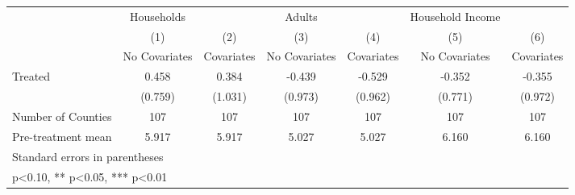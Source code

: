 {
\def\sym#1{\ifmmode^{#1}\else\(^{#1}\)\fi}
\begin{tabular}{l*{6}{c}}
\hline\hline
            &  Households   &               &      Adults   &               &Household Income   &               \\
            &\multicolumn{1}{c}{(1)}&\multicolumn{1}{c}{(2)}&\multicolumn{1}{c}{(3)}&\multicolumn{1}{c}{(4)}&\multicolumn{1}{c}{(5)}&\multicolumn{1}{c}{(6)}\\
            &\multicolumn{1}{c}{No Covariates}&\multicolumn{1}{c}{Covariates}&\multicolumn{1}{c}{No Covariates}&\multicolumn{1}{c}{Covariates}&\multicolumn{1}{c}{No Covariates}&\multicolumn{1}{c}{Covariates}\\
\hline
Treated     &       0.458   &       0.384   &      -0.439   &      -0.529   &      -0.352   &      -0.355   \\
            &     (0.759)   &     (1.031)   &     (0.973)   &     (0.962)   &     (0.771)   &     (0.972)   \\
\hline
Number of Counties&         107   &         107   &         107   &         107   &         107   &         107   \\
Pre-treatment mean&       5.917   &       5.917   &       5.027   &       5.027   &       6.160   &       6.160   \\
\hline\hline
\multicolumn{7}{l}{\footnotesize Standard errors in parentheses}\\
\multicolumn{7}{l}{\footnotesize * p<0.10, ** p<0.05, *** p<0.01}\\
\end{tabular}
}
